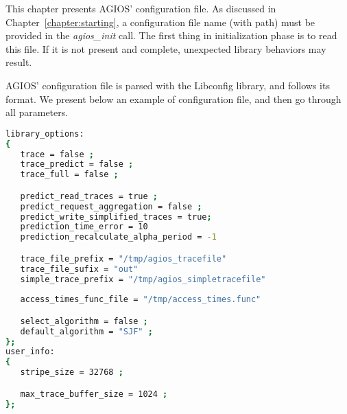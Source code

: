 This chapter presents AGIOS' configuration file. As discussed in Chapter~\ref{chapter:starting}, a configuration file name (with path) must be provided in the \emph{agios\_init} call. The first thing in initialization phase is to read this file. If it is not present and complete, unexpected library behaviors may result.

AGIOS' configuration file is parsed with the Libconfig library, and follows its format. We present below an example of configuration file, and then go through all parameters.

\begin{lstlisting}[language=bash, breaklines=true]
library_options:
{
   trace = false ;
   trace_predict = false ;
   trace_full = false ;

   predict_read_traces = true ;
   predict_request_aggregation = false ;
   predict_write_simplified_traces = true;
   prediction_time_error = 10
   prediction_recalculate_alpha_period = -1

   trace_file_prefix = "/tmp/agios_tracefile"
   trace_file_sufix = "out"
   simple_trace_prefix = "/tmp/agios_simpletracefile"
 
   access_times_func_file = "/tmp/access_times.func"

   select_algorithm = false ;
   default_algorithm = "SJF" ;
};
user_info:
{
   stripe_size = 32768 ;

   max_trace_buffer_size = 1024 ;
};
\end{lstlisting}

